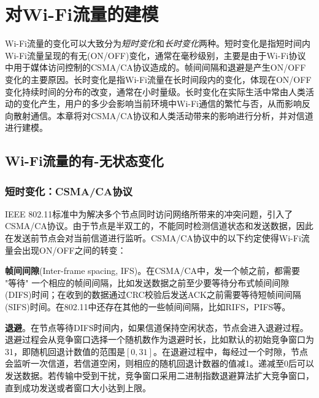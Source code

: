 
\chapter{对Wi-Fi流量的建模}
\label{chap:model}
Wi-Fi流量的变化可以大致分为\emph{短时变化}和\emph{长时变化}两种。短时变化是指短时间内Wi-Fi流量呈现的有无(ON/OFF)变化，通常在毫秒级别，主要是由于Wi-Fi协议中用于媒体访问控制的CSMA/CA协议造成的。帧间间隔和退避是产生ON/OFF变化的主要原因。长时变化是指Wi-Fi流量在长时间段内的变化，体现在ON/OFF变化持续时间的分布的改变，通常在小时量级。长时变化在实际生活中常由人类活动的变化产生，用户的多少会影响当前环境中Wi-Fi通信的繁忙与否，从而影响反向散射通信。本章将对CSMA/CA协议和人类活动带来的影响进行分析，并对信道进行建模。
\section{Wi-Fi流量的有-无状态变化}
\subsection{短时变化：CSMA/CA协议}
IEEE 802.11标准中为解决多个节点同时访问网络所带来的冲突问题，引入了CSMA/CA协议。由于节点是半双工的，不能同时检测信道状态和发送数据，因此在发送前节点会对当前信道进行监听。CSMA/CA协议中的以下约定使得Wi-Fi流量会出现ON/OFF之间的转变：

\textbf{帧间间隙}(Inter-frame spacing, IFS)。在CSMA/CA中，发一个帧之前，都需要 "等待" 一个相应的帧间间隔，比如发送数据之前至少要等待分布式帧间间隙(DIFS)时间；在收到的数据通过CRC校验后发送ACK之前需要等待短帧间间隔(SIFS)时间。在802.11中还存在其他的一些帧间间隔，比如RIFS，PIFS等。

\textbf{退避}。在节点等待DIFS时间内，如果信道保持空闲状态，节点会进入退避过程。退避过程会从竞争窗口选择一个随机数作为退避时长，比如默认的初始竞争窗口为31，即随机回退计数值的范围是$[0,31]$。在退避过程中，每经过一个时隙，节点会监听一次信道，若信道空闲，则相应的随机回退计数器的值减1。递减至0后可以发送数据。若传输中受到干扰，竞争窗口采用二进制指数退避算法扩大竞争窗口，直到成功发送或者窗口大小达到上限。

